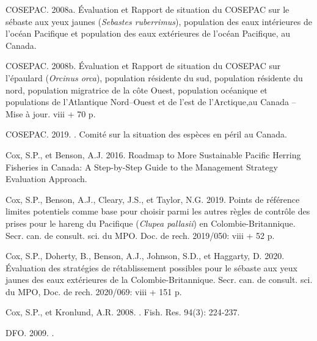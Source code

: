 \documentclass[french,11pt]{book}
\begin{document}
\begin{CSLReferences}{1}{0}
%
COSEPAC. 2008a. Évaluation et Rapport de situation du {COSEPAC} sur le sébaste aux yeux jaunes ({\emph{Sebastes ruberrimus}}), population des eaux intérieures de l'océan Pacifique et population des eaux extérieures de l'océan {Pacifique}, au {Canada}.

%
COSEPAC. 2008b. Évaluation et Rapport de situation du {COSEPAC} sur l'épaulard ({\emph{Orcinus orca}}), population résidente du sud, population résidente du nord, population migratrice de la côte Ouest, population océanique et populations de l'{Atlantique} Nord--Ouest et de l'est de l'{Arctique},au {Canada} -- Mise à jour. viii + 70 p.

%
COSEPAC. 2019. . Comité sur la situation des espèces en péril au Canada.

%
Cox, S.P., et Benson, A.J. 2016. Roadmap to More Sustainable {Pacific} Herring Fisheries in {Canada}: A Step-by-Step Guide to the Management Strategy Evaluation Approach.

%
Cox, S.P., Benson, A.J., Cleary, J.S., et Taylor, N.G. 2019. Points de référence limites potentiels comme base pour choisir parmi les autres règles de contrôle des prises pour le hareng du {Pacifique} {(\emph{Clupea pallasii})} en {Colombie-Britannique}. Secr. can. de consult. sci. du MPO. Doc. de rech. 2019/050: viii + 52 p.

%
Cox, S.P., Doherty, B., Benson, A.J., Johnson, S.D., et Haggarty, D. 2020. Évaluation des stratégies de rétablissement possibles pour le sébaste aux yeux jaunes des eaux extérieures de la {Colombie-Britannique}. Secr. can. de consult. sci. du MPO, Doc. de rech. 2020/069: viii + 151 p.

%
Cox, S.P., et Kronlund, A.R. 2008. . Fish. Res. 94(3): 224‑237.

%
DFO. 2009. .


\end{CSLReferences}
\end{document}
